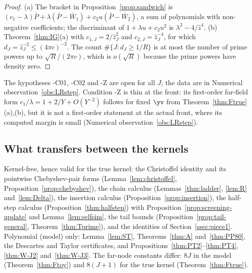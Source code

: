 \begin{proof}
(a) The bracket in Proposition~\ref{prop:sandwich} is
$(c_1-\lambda)\bar P+\lambda(\bar P-\bar W_1)+c_2u(\bar P-\bar W_2)$, a sum of polynomials with non-negative coefficients;
the discriminant of $1+\lambda u+c_2u^2$ is $\lambda^2-4/\hat z^4$. (b) Theorem~\ref{thm:IG}(a) with $c_{1,J}=2/\hat z_J^2$ and
$c_{2,J}=\hat z_J^{-4}$, for which $d_J=\hat z_J^{-2}\le(4\pi c)^{-2}$. The count $\#\{J:d_J\ge1/R\}$ is at most the number
of prime powers up to $\sqrt R/(2\pi c)$, which is $o(\sqrt R)$ because the prime powers have density zero.
\end{proof}

The hypotheses \hyp{C01}, \hyp{C02} and \hyp{Z} are open for all $J$; the data are in Numerical
observation~\ref{obs:LRstep}. Condition \hyp{Z} is thin at the front: its first-order far-field form
$c_1/\lambda=1+2/Y+O(Y^{-2})$ follows for fixed $\yv$ from Theorem~\ref{thm:Ftrue}(a),(b), but it is not a first-order
statement at the actual front, where its computed margin is small (Numerical observation~\ref{obs:LRstep}).

\subsection{What transfers between the kernels}\label{ssec:transfer}

\begin{remark}\label{rem:transfer}
Kernel-free, hence valid for the true kernel: the Christoffel identity and its pointwise Chebyshev-pair forms
(Lemma~\ref{lem:christoffel}, Proposition~\ref{prop:chebyshev}), the chain calculus (Lemmas~\ref{thm:ladder},
\ref{lem:R} and~\ref{lem:Delta}), the insertion calculus (Proposition~\ref{prop:insertion}), the half-step
calculus (Proposition~\ref{thm:halfstep}) with Proposition~\ref{prop:screening-update} and Lemma~\ref{lem:selfsim}, the tail
bounds (Proposition~\ref{prop:tail-general}, Theorem~\ref{thm:Tprime}), and the identities of Section~\ref{ssec:piece1}.
Polynomial (model) only: Lemma~\ref{lem:ST}, Theorems~\ref{thm:A} and~\ref{thm:PP80}, the Descartes and Taylor
certificates, and Propositions~\ref{thm:PT2}--\ref{thm:PT4}, \ref{thm:W-J2} and~\ref{thm:W-J3}. The far-node constants differ:
$8J$ in the model (Theorem~\ref{thm:Ftoy}) and $8(J+1)$ for the true kernel (Theorem~\ref{thm:Ftrue}).
\end{remark}
